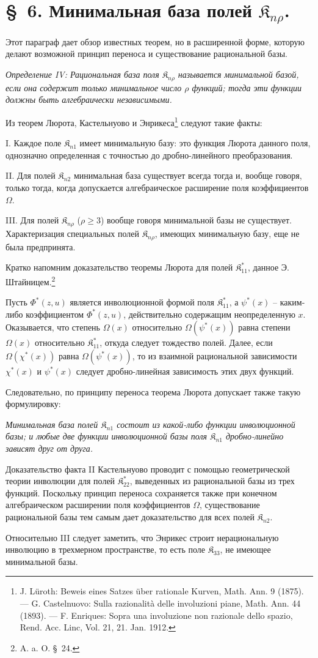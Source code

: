 \documentclass[11pt]{article}
\providecommand{\Kfield}{\mathfrak{K}}
\begin{document}
\section*{\S\ 6. Минимальная база полей $\Kfield_{n\rho}$.}

Этот параграф дает обзор известных теорем, но в расширенной форме, которую делают возможной принцип переноса и существование рациональной базы.

\emph{Определение IV: Рациональная база поля $\Kfield_{n\rho}$ называется минимальной базой, если она содержит только минимальное число $\rho$ функций; тогда эти функции должны быть алгебраически независимыми.}

Из теорем Люрота, Кастельнуово и Энрикеса\footnote{J. Lüroth: Beweis eines Satzes über rationale Kurven, Math. Ann. 9 (1875). --- G. Castelnuovo: Sulla razionalità delle involuzioni piane, Math. Ann. 44 (1893). --- F. Enriques: Sopra una involuzione non razionale dello spazio, Rend. Acc. Linc, Vol. 21, 21. Jan. 1912.} следуют такие факты:

I. Каждое поле $\Kfield_{n1}$ имеет минимальную базу: это функция Люрота данного поля, однозначно определенная с точностью до дробно-линейного преобразования.

II. Для полей $\Kfield_{n2}$ минимальная база существует всегда тогда и, вообще говоря, только тогда, когда допускается алгебраическое расширение поля коэффициентов $\Omega$.

III. Для полей $\Kfield_{n\rho}$ ($\rho\ge3$) вообще говоря минимальной базы не существует. Характеризация специальных полей $\Kfield_{n\rho}$, имеющих минимальную базу, еще не была предпринята.

Кратко напомним доказательство теоремы Люрота для полей $\Kfield^*_{11}$, данное Э. Штайницем.\footnote{A. a. O. \S\ 24.}

Пусть $\Phi^*(z,u)$ является инволюционной формой поля $\Kfield^*_{11}$, а $\psi^*(x)$ -- каким-либо коэффициентом $\Phi^*(z,u)$, действительно содержащим неопределенную $x$. Оказывается, что степень $\Omega(x)$ относительно $\Omega(\psi^*(x))$ равна степени $\Omega(x)$ относительно $\Kfield^*_{11}$, откуда следует тождество полей. Далее, если $\Omega(\chi^*(x))$ равна $\Omega(\psi^*(x))$, то из взаимной рациональной зависимости $\chi^*(x)$ и $\psi^*(x)$ следует дробно-линейная зависимость этих двух функций.

Следовательно, по принципу переноса теорема Люрота допускает также такую формулировку:

\emph{Минимальная база полей $\Kfield_{n1}$ состоит из какой-либо функции инволюционной базы; и любые две функции инволюционной базы поля $\Kfield_{n1}$ дробно-линейно зависят друг от друга.}

Доказательство факта II Кастельнуово проводит с помощью геометрической теории инволюции для полей $\Kfield^*_{22}$, выведенных из рациональной базы из трех функций. Поскольку принцип переноса сохраняется также при конечном алгебраическом расширении поля коэффициентов $\Omega$, существование рациональной базы тем самым дает доказательство для всех полей $\Kfield_{n2}$.

Относительно III следует заметить, что Энрикес строит нерациональную инволюцию в трехмерном пространстве, то есть поле $\Kfield_{33}$, не имеющее минимальной базы.
\end{document}
